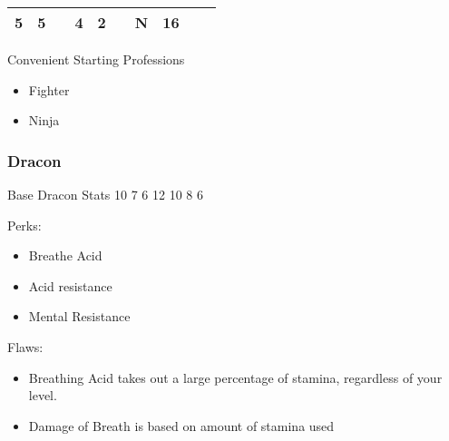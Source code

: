 \documentclass[12pt]{article}
\begin{document}
\begin{longtable}[]{@{}llllllllll@{}}
\begin{minipage}[t]{0.06\columnwidth}
5
\strut\end{minipage} &
\begin{minipage}[t]{0.06\columnwidth}\raggedright\strut
5
\strut\end{minipage} &
\begin{minipage}[t]{0.06\columnwidth}\raggedright\strut
\strut\end{minipage} &
\begin{minipage}[t]{0.06\columnwidth}\raggedright\strut
4
\strut\end{minipage} &
\begin{minipage}[t]{0.06\columnwidth}\raggedright\strut
2
\strut\end{minipage} &
\begin{minipage}[t]{0.06\columnwidth}\raggedright\strut
\strut\end{minipage} &
\begin{minipage}[t]{0.07\columnwidth}\raggedright\strut
N
\strut\end{minipage} &
\begin{minipage}[t]{0.08\columnwidth}\raggedright\strut
16
\strut\end{minipage}\tabularnewline
\bottomrule
\end{longtable}

Convenient Starting Professions

\begin{itemize}
\item
  Fighter
\item
  Ninja
\end{itemize}

\subsubsection{Dracon}\label{dracon}

Base Dracon Stats 10 7 6 12 10 8 6

Perks:

\begin{itemize}
\item
  Breathe Acid
\item
  Acid resistance
\item
  Mental Resistance 
\end{itemize}

Flaws:

\begin{itemize}
\item
  Breathing Acid takes out a large percentage of stamina, regardless of
  your level.
\item
  Damage of Breath is based on amount of stamina used
\end{itemize}
\end{document}
